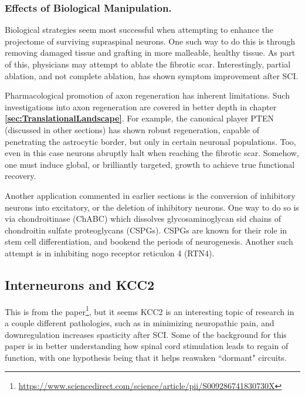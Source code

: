 \subsubsection{Effects of Biological Manipulation.}

Biological strategies seem most successful when attempting to enhance the projectome of surviving supraspinal neurons. One such way to do this is through removing damaged tissue and grafting in more malleable, healthy tissue. As part of this, physicians may attempt to ablate the fibrotic scar. Interestingly, partial ablation, and not complete ablation, has shown symptom improvement after SCI. \newline

Pharmacological promotion of axon regeneration has inherent limitations. Such investigations into axon regeneration are covered in better depth in chapter \textbf{\ref{sec:TranslationalLandscape}}. For example, the canonical player PTEN (discussed in other sections) has shown robust regeneration, capable of penetrating the astrocytic border, but only in certain neuronal populations. Too, even in this case neurons abruptly halt when reaching the fibrotic scar. Somehow, one must induce global, or brilliantly targeted, growth to achieve true functional recovery. \newline

Another application commented in earlier sections is the conversion of inhibitory neurons into excitatory, or the deletion of inhibitory neurons. One way to do so is via chondroitinase (ChABC) which dissolves glycosaminoglycan sid chains of chondroitin sulfate proteoglycans (CSPGs). CSPGs are known for their role in stem cell differentiation, and bookend the periods of neurogenesis. Another such attempt is in inhibiting nogo receptor reticulon 4 (RTN4). \newline


\subsection{Interneurons and KCC2}
\label{sec:KCC2}

This is from the paper\footnote{\url{https://www.sciencedirect.com/science/article/pii/S009286741830730X}}, but it seems KCC2 is an interesting topic of research in a couple different pathologies, such as in minimizing neuropathic pain, and downregulation increases spasticity after SCI. Some of the background for this paper is in better understanding how spinal cord stimulation leads to regain of function, with one hypothesis being that it helps reawaken ``dormant" circuits.\newline

